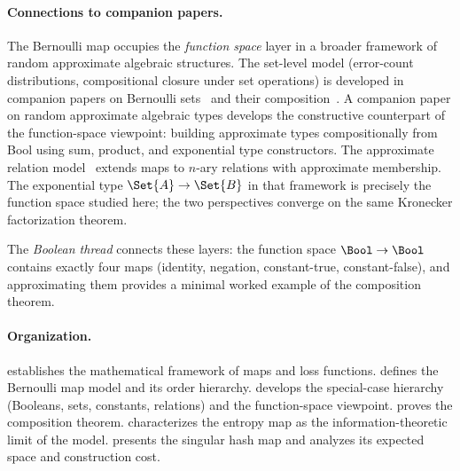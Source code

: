 \documentclass[ ../main.tex]{subfiles}
\begin{document}
\paragraph{Connections to companion papers.}
The Bernoulli map occupies the \emph{function space} layer in a broader framework of random approximate algebraic structures.
The set-level model (error-count distributions, compositional closure under set operations) is developed in companion papers on Bernoulli sets~\cite{aset} and their composition~\cite{bernoulliComposition}.
A companion paper on random approximate algebraic types develops the constructive counterpart of the function-space viewpoint: building approximate types compositionally from Bool using sum, product, and exponential type constructors.
The approximate relation model~\cite{arelation} extends maps to $n$-ary relations with approximate membership.
The exponential type $\Set{A} \to \Set{B}$ in that framework is precisely the function space studied here; the two perspectives converge on the same Kronecker factorization theorem.

The \emph{Boolean thread} connects these layers: the function space $\Bool \to \Bool$ contains exactly four maps (identity, negation, constant-true, constant-false), and approximating them provides a minimal worked example of the composition theorem.

\paragraph{Organization.}
 establishes the mathematical framework of maps and loss functions.
 defines the Bernoulli map model and its order hierarchy.
 develops the special-case hierarchy (Booleans, sets, constants, relations) and the function-space viewpoint.
 proves the composition theorem.
 characterizes the entropy map as the information-theoretic limit of the model.
 presents the singular hash map and analyzes its expected space and construction cost.
\end{document}
